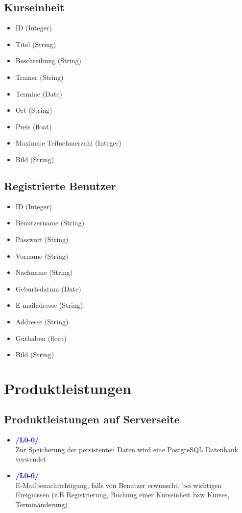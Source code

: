 \documentclass[a4paper]{scrreprt}
\newcounter{Lc}
\newcounter{Hc}
\newcommand{\resetAllCounter}{\setcounter{Lc}{0}\setcounter{Hc}{1}}
\begin{document}
	
	\section{Kurseinheit}
	\Func {} 
	\begin{itemize}
		\item ID (Integer)
		\item Titel (String)
		\item Beschreibung (String)
		\item Trainer (String)
		\item Termine (Date)
		\item Ort (String)
		\item Preis (float)
		\item Maximale Teilnehmerzahl (Integer)
		\item Bild (String)
	\end{itemize}

    
    
    		
    \section{Registrierte Benutzer}
    \Func {} 
    \begin{itemize}
    	\item ID (Integer)
    	\item Benutzername (String)
    	\item Passwort (String)
    	\item Vorname (String)
    	\item Nachname (String)
    	\item Geburtsdatum (Date)
    	\item E-mailadresse (String)
    	\item Addresse (String)
    	\item Guthaben (float)
    	\item Bild (String)
    \end{itemize}
      
	    
	   
\resetAllCounter
\renewcommand{\Func}[1]{\stepcounter{Lc}\textcolor{Blue}{\textbf{/L\arabic{Hc}0-\arabic{Lc}0/} #1} \\}	    
    
\chapter{Produktleistungen}
	

	\section{Produktleistungen auf Serverseite}
	\begin{itemize}
		\item \Func{} Zur Speicherung der persistenten Daten wird eine PostgreSQL Datenbank verwendet
		\item \Func{} E-Mailbenachrichtigung, falls von Benutzer erwünscht, bei wichtigen Ereignissen (z.B Registrierung, Buchung einer Kurseinheit bzw Kurses, Terminänderung)
	\end{itemize}
	
\end{document}
